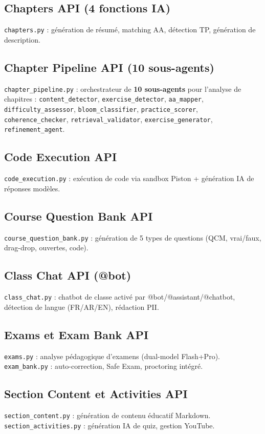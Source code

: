 \documentclass[12pt,a4paper]{article}
\begin{document}
\subsection{Chapters API (4 fonctions IA)}
\texttt{chapters.py} : génération de résumé, matching AA, détection TP, génération de description.

\subsection{Chapter Pipeline API (10 sous-agents)}
\texttt{chapter\_pipeline.py} : orchestrateur de \textbf{10 sous-agents} pour l'analyse de chapitres : \texttt{content\_detector}, \texttt{exercise\_detector}, \texttt{aa\_mapper}, \texttt{difficulty\_assessor}, \texttt{bloom\_classifier}, \texttt{practice\_scorer}, \texttt{coherence\_checker}, \texttt{retrieval\_validator}, \texttt{exercise\_generator}, \texttt{refinement\_agent}.

\subsection{Code Execution API}
\texttt{code\_execution.py} : exécution de code via sandbox Piston + génération IA de réponses modèles.

\subsection{Course Question Bank API}
\texttt{course\_question\_bank.py} : génération de 5 types de questions (QCM, vrai/faux, drag-drop, ouvertes, code).

\subsection{Class Chat API (@bot)}
\texttt{class\_chat.py} : chatbot de classe activé par @bot/@assistant/@chatbot, détection de langue (FR/AR/EN), rédaction PII.

\subsection{Exams et Exam Bank API}
\texttt{exams.py} : analyse pédagogique d'examens (dual-model Flash+Pro). \\
\texttt{exam\_bank.py} : auto-correction, Safe Exam, proctoring intégré.

\subsection{Section Content et Activities API}
\texttt{section\_content.py} : génération de contenu éducatif Markdown. \\
\texttt{section\_activities.py} : génération IA de quiz, gestion YouTube.
\end{document}
